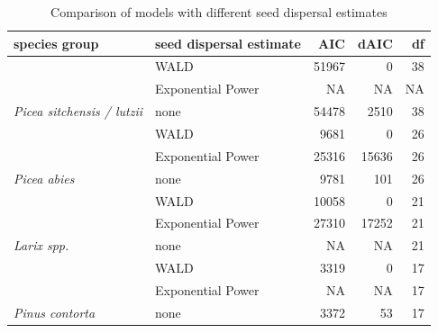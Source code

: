\documentclass[
]{article}
\begin{document}
\begin{table}

\caption{\label{tab:model-comparison-table}Comparison of models with different seed dispersal estimates}
\centering
\begin{tabular}[t]{>{}llrrr}
\toprule
species group & seed dispersal estimate & AIC & dAIC & df\\
\midrule
 & WALD & 51967 & 0 & 38\\

 & Exponential Power & NA & NA & NA\\

\multirow{-3}{*}{\raggedright\arraybackslash \em{Picea sitchensis / lutzii}} & none & 54478 & 2510 & 38\\
\cmidrule{1-5}
 & WALD & 9681 & 0 & 26\\

 & Exponential Power & 25316 & 15636 & 26\\

\multirow{-3}{*}{\raggedright\arraybackslash \em{Picea abies}} & none & 9781 & 101 & 26\\
\cmidrule{1-5}
 & WALD & 10058 & 0 & 21\\

 & Exponential Power & 27310 & 17252 & 21\\

\multirow{-3}{*}{\raggedright\arraybackslash \em{Larix spp.}} & none & NA & NA & 21\\
\cmidrule{1-5}
 & WALD & 3319 & 0 & 17\\

 & Exponential Power & NA & NA & 17\\

\multirow{-3}{*}{\raggedright\arraybackslash \em{Pinus contorta}} & none & 3372 & 53 & 17\\
\bottomrule
\end{tabular}
\end{table}
\end{document}
